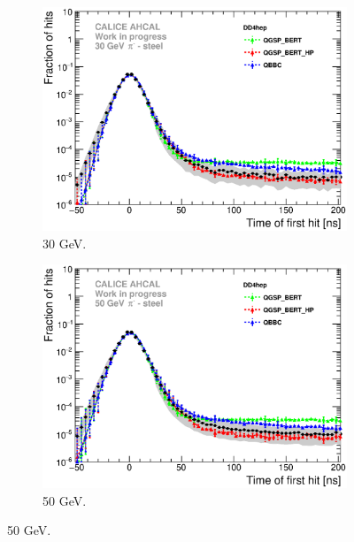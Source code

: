 \begin{figure}[htbp!]
  \begin{subfigure}[t]{0.49\textwidth}
    \centering
    \includegraphics[width=1\textwidth]{../Thesis_Plots/Timing/Pions/Plots/ComparisonToSim/Comparison_SimData_Pion30GeV_LateClusters_DD4hep.eps}
    \caption{30 GeV.}\label{fig:dNdt_SimData_30GeV_DD4hep}
  \end{subfigure}
  \hfill
  \begin{subfigure}[t]{0.49\textwidth}
    \centering
    \includegraphics[width=1\textwidth]{../Thesis_Plots/Timing/Pions/Plots/ComparisonToSim/Comparison_SimData_Pion50GeV_LateClusters_DD4hep.eps}
    \caption{50 GeV.} \label{fig:dNdt_SimData_50GeV_DD4hep}
  \end{subfigure}

\end{figure}
